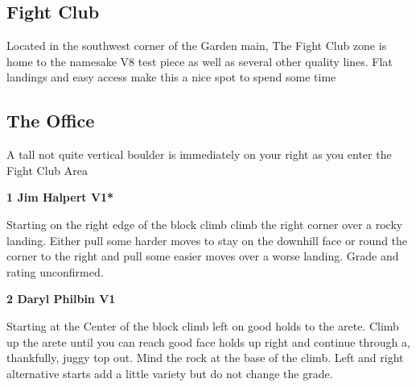 \begin{multicols}{2}
		\section{Fight Club}\label{sa:Fight Club}
	\begin{minipage}{\columnwidth}
	Located in the southwest corner of the Garden main, The Fight Club zone is home to the namesake V8 test piece as well as several other quality lines. Flat landings and easy access make this a nice spot to spend some time
	\end{minipage}

			\subsection*{The Office}\label{bf:The Office}
			\begin{minipage}{\columnwidth}
			A tall not quite vertical boulder is immediately on your right as you enter the Fight Club Area
			\end{minipage}
			
					\begin{minipage}{\linewidth}	
					\label{rt:Jim Halpert}
\colorbox{green!20}{
\textbf{
1 Jim Halpert V1*  \warn \warn 
}
}

					\begin{adjustwidth}{0.5cm}{}				
					Starting on the right edge of the block climb climb the right corner over a rocky landing. Either pull some harder moves to stay on the downhill face or round the corner to the right and pull some easier moves over a worse landing. Grade and rating unconfirmed.
					\end{adjustwidth}
					\end{minipage}

					\begin{minipage}{\linewidth}	
					\label{rt:Daryl Philbin}
\colorbox{green!20}{
\textbf{
2 Daryl Philbin V1     \warn 
}
}

					\begin{adjustwidth}{0.5cm}{}				
					Starting at the Center of the block climb left on good holds to the arete. Climb up the arete until you can reach good face holds up right and continue through a, thankfully, juggy top out. Mind the rock at the base of the climb. Left and right alternative starts add a little variety but do not change the grade.
					\end{adjustwidth}
					\end{minipage}

\end{multicols}
